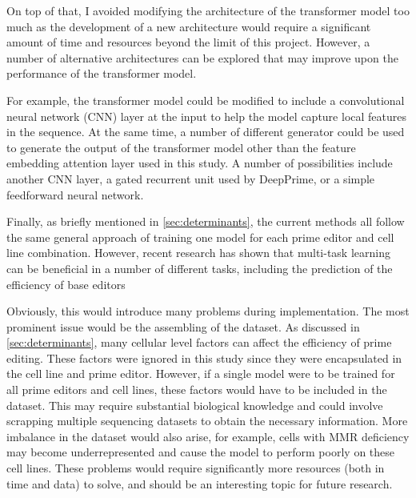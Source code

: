 On top of that, I avoided modifying the architecture of the transformer model too much as the development of a new architecture would require a significant amount of time and resources beyond the limit of this project. However, a number of alternative architectures can be explored that may improve upon the performance of the transformer model.

For example, the transformer model could be modified to include a convolutional neural network (CNN) layer at the input to help the model capture local features in the sequence. At the same time, a number of different generator could be used to generate the output of the transformer model other than the feature embedding attention layer used in this study. A number of possibilities include another CNN layer, a gated recurrent unit used by DeepPrime, or a simple feedforward neural network. 

Finally, as briefly mentioned in \autoref{sec:determinants}, the current methods all follow the same general approach of training one model for each prime editor and cell line combination. However, recent research has shown that multi-task learning can be beneficial in a number of different tasks, including the prediction of the efficiency of base editors\cite{mollaysaAttentionbasedMultitaskLearning2023a}

Obviously, this would introduce many problems during implementation. The most prominent issue would be the assembling of the dataset. As discussed in \autoref{sec:determinants}, many cellular level factors can affect the efficiency of prime editing. These factors were ignored in this study since they were encapsulated in the cell line and prime editor. However, if a single model were to be trained for all prime editors and cell lines, these factors would have to be included in the dataset. This may require substantial biological knowledge and could involve scrapping multiple sequencing datasets to obtain the necessary information. 
More imbalance in the dataset would also arise, for example, cells with MMR deficiency may become underrepresented and cause the model to perform poorly on these cell lines. 
These problems would require significantly more resources (both in time and data) to solve, and should be an interesting topic for future research.